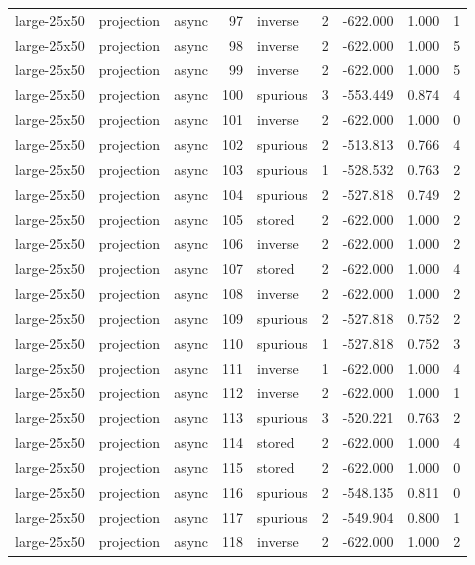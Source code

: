 \begin{tabular}{lllrlrrrr}
large-25x50 & projection & async & 97 & inverse & 2 & -622.000 & 1.000 & 1 \\
large-25x50 & projection & async & 98 & inverse & 2 & -622.000 & 1.000 & 5 \\
large-25x50 & projection & async & 99 & inverse & 2 & -622.000 & 1.000 & 5 \\
large-25x50 & projection & async & 100 & spurious & 3 & -553.449 & 0.874 & 4 \\
large-25x50 & projection & async & 101 & inverse & 2 & -622.000 & 1.000 & 0 \\
large-25x50 & projection & async & 102 & spurious & 2 & -513.813 & 0.766 & 4 \\
large-25x50 & projection & async & 103 & spurious & 1 & -528.532 & 0.763 & 2 \\
large-25x50 & projection & async & 104 & spurious & 2 & -527.818 & 0.749 & 2 \\
large-25x50 & projection & async & 105 & stored & 2 & -622.000 & 1.000 & 2 \\
large-25x50 & projection & async & 106 & inverse & 2 & -622.000 & 1.000 & 2 \\
large-25x50 & projection & async & 107 & stored & 2 & -622.000 & 1.000 & 4 \\
large-25x50 & projection & async & 108 & inverse & 2 & -622.000 & 1.000 & 2 \\
large-25x50 & projection & async & 109 & spurious & 2 & -527.818 & 0.752 & 2 \\
large-25x50 & projection & async & 110 & spurious & 1 & -527.818 & 0.752 & 3 \\
large-25x50 & projection & async & 111 & inverse & 1 & -622.000 & 1.000 & 4 \\
large-25x50 & projection & async & 112 & inverse & 2 & -622.000 & 1.000 & 1 \\
large-25x50 & projection & async & 113 & spurious & 3 & -520.221 & 0.763 & 2 \\
large-25x50 & projection & async & 114 & stored & 2 & -622.000 & 1.000 & 4 \\
large-25x50 & projection & async & 115 & stored & 2 & -622.000 & 1.000 & 0 \\
large-25x50 & projection & async & 116 & spurious & 2 & -548.135 & 0.811 & 0 \\
large-25x50 & projection & async & 117 & spurious & 2 & -549.904 & 0.800 & 1 \\
large-25x50 & projection & async & 118 & inverse & 2 & -622.000 & 1.000 & 2 \\

\end{tabular}
